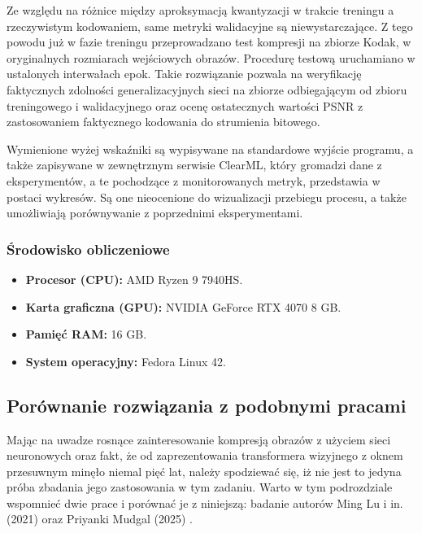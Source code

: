 Ze względu na różnice między aproksymacją kwantyzacji w trakcie treningu a rzeczywistym kodowaniem, same metryki walidacyjne są niewystarczające. Z tego powodu już w fazie treningu przeprowadzano test kompresji na zbiorze Kodak, w oryginalnych rozmiarach wejściowych obrazów. Procedurę testową uruchamiano w ustalonych interwałach epok. Takie rozwiązanie pozwala na weryfikację faktycznych zdolności generalizacyjnych sieci na zbiorze odbiegającym od zbioru treningowego i walidacyjnego oraz ocenę ostatecznych wartości PSNR z zastosowaniem faktycznego kodowania do strumienia bitowego.

Wymienione wyżej wskaźniki są wypisywane na standardowe wyjście programu, a także zapisywane w zewnętrznym serwisie ClearML, który gromadzi dane z eksperymentów, a te pochodzące z monitorowanych metryk, przedstawia w postaci wykresów. Są one nieocenione do wizualizacji przebiegu procesu, a także umożliwiają porównywanie z poprzednimi eksperymentami.

\subsubsection{Środowisko obliczeniowe} \label{srodowisko-obliczeniowe}
\begin{itemize}
	\item \textbf{Procesor (CPU):} AMD Ryzen 9 7940HS.
	\item \textbf{Karta graficzna (GPU):} NVIDIA GeForce RTX 4070 8 GB.
	\item \textbf{Pamięć RAM:} 16 GB.
	\item \textbf{System operacyjny:} Fedora Linux 42.
\end{itemize}

\subsection{Porównanie rozwiązania z podobnymi pracami}
Mając na uwadze rosnące zainteresowanie kompresją obrazów z użyciem sieci neuronowych oraz fakt, że od zaprezentowania transformera wizyjnego z oknem przesuwnym minęło niemal pięć lat, należy spodziewać się, iż nie jest to jedyna próba zbadania jego zastosowania w tym zadaniu. Warto w tym podrozdziale wspomnieć dwie prace i porównać je z niniejszą: badanie autorów Ming Lu i in. (2021)\cite{lu2021transformerbasedimagecompression} oraz Priyanki Mudgal (2025) \cite{mudgal2025variablerateimagecompression}.

